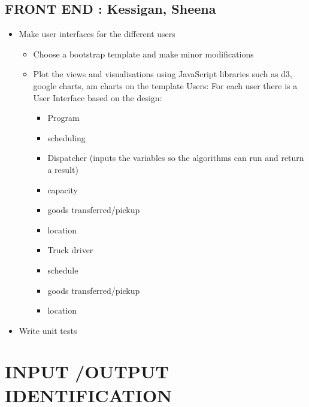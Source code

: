 \documentclass[paper=a4, fontsize=11pt]{scrartcl} %
\numberwithin{equation}{section} %
\numberwithin{figure}{section} %
\numberwithin{table}{section} %
\begin{document}
\subsection{	FRONT END : Kessigan, Sheena}

\begin{itemize}
	\item  Make user interfaces for the different users

		\begin{itemize}
		 \item Choose a bootstrap template and make minor modifications
		\item Plot the views and visualisations using JavaScript libraries such as d3, google charts, am charts on the template Users: For each user there is a User Interface based on the design:
		
		\begin{itemize}
		\item Program
		\item scheduling
		\item Dispatcher (inputs the variables so the algorithms can run and return a result)
		\item capacity
					\item goods transferred/pickup
					\item location
				\item Truck driver
					\item schedule
					\item goods transferred/pickup
					\item location
		\end{itemize}
		
		\end{itemize}
	\item Write unit tests 
\end{itemize}

\section{INPUT /OUTPUT IDENTIFICATION}
\end{document}
